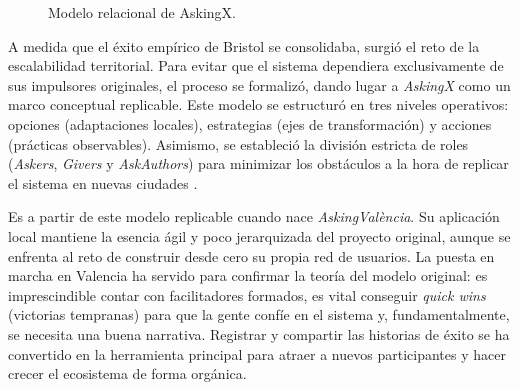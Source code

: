 \documentclass[11pt,oneside,spanish,listoffigures,listoftables]{tfgetsinf}
\begin{document}
\begin{figure}[htbp]
\centering
{}
\caption[Modelo relacional de AskingX]{Modelo relacional de AskingX.}
\label{fig:modelo-askingx}
\end{figure}

A medida que el éxito empírico de Bristol se consolidaba, surgió el reto de la escalabilidad territorial. Para evitar que el sistema dependiera exclusivamente de sus impulsores originales, el proceso se formalizó, dando lugar a \textit{AskingX} como un marco conceptual replicable. Este modelo se estructuró en tres niveles operativos: opciones (adaptaciones locales), estrategias (ejes de transformación) y acciones (prácticas observables). Asimismo, se estableció la división estricta de roles (\textit{Askers}, \textit{Givers} y \textit{AskAuthors}) para minimizar los obstáculos a la hora de replicar el sistema en nuevas ciudades \cite{canos_manley_2024}.

Es a partir de este modelo replicable cuando nace \textit{AskingValència}. Su aplicación local mantiene la esencia ágil y poco jerarquizada del proyecto original, aunque se enfrenta al reto de construir desde cero su propia red de usuarios. La puesta en marcha en Valencia ha servido para confirmar la teoría del modelo original: es imprescindible contar con facilitadores formados, es vital conseguir \textit{quick wins} (victorias tempranas) para que la gente confíe en el sistema y, fundamentalmente, se necesita una buena narrativa. Registrar y compartir las historias de éxito se ha convertido en la herramienta principal para atraer a nuevos participantes y hacer crecer el ecosistema de forma orgánica.
\end{document}
